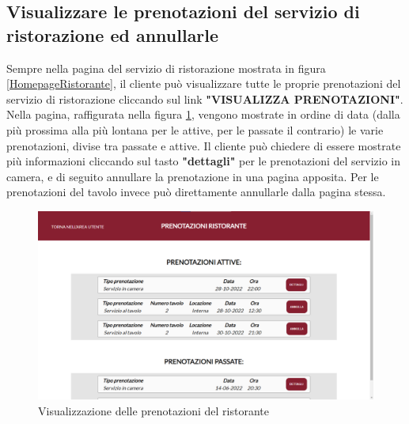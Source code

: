 \documentclass [a4paper, 12pt]{book}
\begin{document}
\subsection{Visualizzare le prenotazioni del servizio di ristorazione ed annullarle}
Sempre nella pagina del servizio di ristorazione mostrata in figura \ref{HomepageRistorante}, il cliente può visualizzare tutte le proprie prenotazioni del servizio di ristorazione cliccando sul link \textbf{"VISUALIZZA PRENOTAZIONI"}. Nella pagina, raffigurata nella figura \ref{PrenotazioniRistoranteCliente}, vengono mostrate in ordine di data (dalla più prossima alla più lontana per le attive, per le passate il contrario) le varie prenotazioni, divise tra passate e attive. Il cliente può chiedere di essere mostrate più informazioni cliccando sul tasto \textbf{"dettagli"} per le prenotazioni del servizio in camera, e di seguito annullare la prenotazione in una pagina apposita. Per le prenotazioni del tavolo invece può direttamente annullarle dalla pagina stessa.\newpage
\begin{figure}[!h]
\centering
\includegraphics[scale=0.3]{PrenotazioniRistoranteCliente.png}
\caption{Visualizzazione delle prenotazioni del ristorante}
\label{PrenotazioniRistoranteCliente}
\end{figure}
\end{document}
